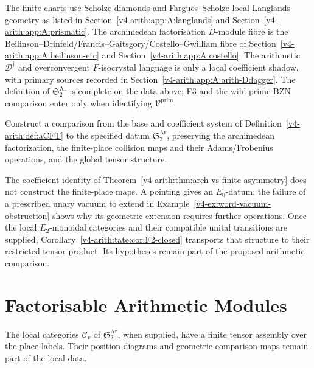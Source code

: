 \begin{remark}
\label{v4-arith:platonic:rem:sources}
The finite charts use Scholze diamonds and Fargues--Scholze local
Langlands geometry as listed in
Section~\ref{v4-arith:app:A:langlands} and
Section~\ref{v4-arith:app:A:prismatic}. The
archimedean factorisation \(D\)-module fibre is the
Beilinson--Drinfeld/Francis--Gaitsgory/Costello--Gwilliam fibre of
Section~\ref{v4-arith:app:A:beilinson-etc} and
Section~\ref{v4-arith:app:A:costello}. The
arithmetic \(\mathcal{D}^{\dagger}\) and overconvergent
\(F\)-isocrystal language is only a local coefficient shadow, with
primary sources recorded in
Section~\ref{v4-arith:app:A:arith-Ddagger}. The definition of
\(\mathfrak{S}^{\mathrm{Ar}}_{2}\) is complete on the data above; F3
and the wild-prime BZN comparison enter only when identifying
\(\mathcal{V}^{\mathrm{prim}}\).
\end{remark}

\begin{question}
\label{v4-arith:platonic:thm:base-upgrade}
Construct a comparison from the base and coefficient system of
Definition~\ref{v4-arith:def:aCFT} to the specified datum
\(\mathfrak S^{\mathrm{Ar}}_2\), preserving the archimedean
factorization, the finite-place collision maps and their
Adams/Frobenius operations, and the global tensor structure.
\end{question}

The coefficient identity of
Theorem~\ref{v4-arith:thm:arch-vs-finite-asymmetry} does not construct
the finite-place maps. A pointing gives an \(E_0\)-datum;
the failure of a prescribed unary vacuum to extend in
Example~\ref{v4-ex:word-vacuum-obstruction} shows why its geometric
extension requires further operations. Once the local
\(E_2\)-monoidal categories and their compatible unital transitions
are supplied, Corollary~\ref{v4-arith:tate:cor:F2-closed} transports
that structure to their restricted tensor product. Its hypotheses
remain part of the proposed arithmetic comparison.

\section{Factorisable Arithmetic Modules}
\label{v4-arith:platonic:fact-modules}

The local categories \(\mathcal C_v\) of
\(\mathfrak S^{\mathrm{Ar}}_2\), when supplied, have a finite
tensor assembly over the place labels. Their position diagrams and
geometric comparison maps remain part of the local data.

